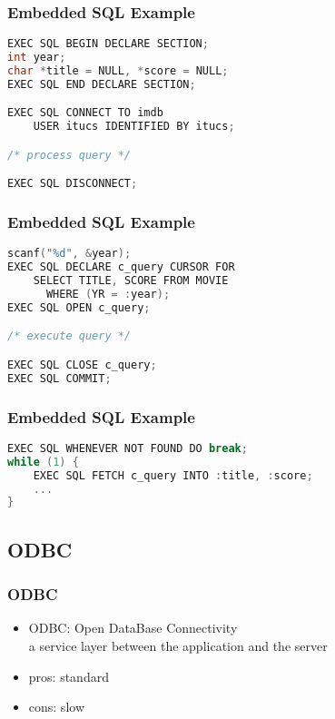 \documentclass[dvipsnames]{beamer}
\theoremstyle{plain}
\begin{document}
\begin{frame}[fragile]
  \frametitle{Embedded SQL Example}

  \begin{example}[connecting]
    \begin{lstlisting}[language=C]
EXEC SQL BEGIN DECLARE SECTION;
int year;
char *title = NULL, *score = NULL;
EXEC SQL END DECLARE SECTION;

EXEC SQL CONNECT TO imdb
    USER itucs IDENTIFIED BY itucs;

/* process query */

EXEC SQL DISCONNECT;
    \end{lstlisting}
 \end{example}
\end{frame}

\begin{frame}[fragile]
  \frametitle{Embedded SQL Example}

  \begin{example}
    \begin{lstlisting}[language=C]
scanf("%d", &year);
EXEC SQL DECLARE c_query CURSOR FOR
    SELECT TITLE, SCORE FROM MOVIE
      WHERE (YR = :year);
EXEC SQL OPEN c_query;

/* execute query */

EXEC SQL CLOSE c_query;
EXEC SQL COMMIT;
    \end{lstlisting}
 \end{example}
\end{frame}

\begin{frame}[fragile]
  \frametitle{Embedded SQL Example}

  \begin{example}
    \begin{lstlisting}[language=C]
EXEC SQL WHENEVER NOT FOUND DO break;
while (1) {
    EXEC SQL FETCH c_query INTO :title, :score;
    ...
}
    \end{lstlisting}
 \end{example}
\end{frame}

\lstset{language=ExtendedPHP}

\subsection{ODBC}

\begin{frame}[label=odbc]
  \frametitle{ODBC}

  \begin{itemize}
    \item \alert{ODBC}: Open DataBase Connectivity\\
      a service layer between the application and the server

    \pause
    \bigskip
    \item pros: standard
    \item cons: slow
  \end{itemize}
\end{frame}
\end{document}
